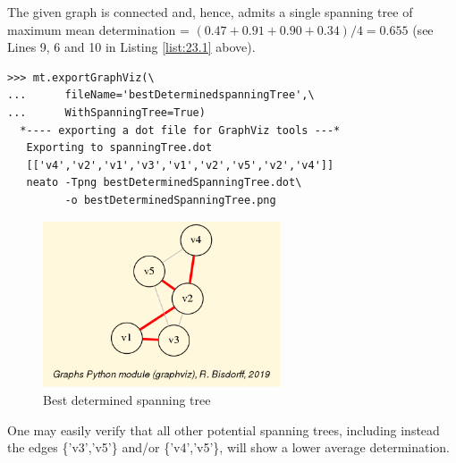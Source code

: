 The given graph is connected and, hence, admits a single spanning tree of maximum mean determination = $(0.47 + 0.91 + 0.90 + 0.34)/4 = 0.655$ (see Lines 9, 6 and 10 in Listing \ref{list:23.1} above).
\begin{lstlisting}
>>> mt.exportGraphViz(\
...      fileName='bestDeterminedspanningTree',\
...      WithSpanningTree=True)
  *---- exporting a dot file for GraphViz tools ---*
   Exporting to spanningTree.dot
   [['v4','v2','v1','v3','v1','v2','v5','v2','v4']]
   neato -Tpng bestDeterminedSpanningTree.dot\
         -o bestDeterminedSpanningTree.png
\end{lstlisting}
\begin{figure}[h]
\sidecaption
\includegraphics[width=7cm]{Figures/bestDeterminedSpanningTree.png}
\caption{Best determined spanning tree} 
\label{fig:23.7}       %
\end{figure}

One may easily verify that all other potential spanning trees, including instead the edges \{'v3','v5'\} and/or \{'v4','v5'\}, will show a lower average determination.
 
\clearpage
{}
{}

\typeout{}

%